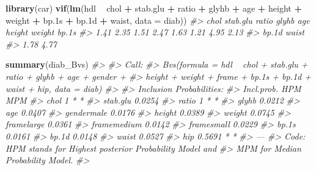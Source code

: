 \documentclass[]{book}
\newenvironment{Shaded}{\begin{snugshade}}{\end{snugshade}}
\newcommand{\CommentTok}[1]{\textcolor[rgb]{0.56,0.35,0.01}{\textit{#1}}}
\newcommand{\DataTypeTok}[1]{\textcolor[rgb]{0.13,0.29,0.53}{#1}}
\newcommand{\FloatTok}[1]{\textcolor[rgb]{0.00,0.00,0.81}{#1}}
\newcommand{\KeywordTok}[1]{\textcolor[rgb]{0.13,0.29,0.53}{\textbf{#1}}}
\newcommand{\NormalTok}[1]{#1}
\newcommand{\OperatorTok}[1]{\textcolor[rgb]{0.81,0.36,0.00}{\textbf{#1}}}
\newcommand{\StringTok}[1]{\textcolor[rgb]{0.31,0.60,0.02}{#1}}
\begin{document}
\begin{Shaded}
\begin{Highlighting}[]
\KeywordTok{library}\NormalTok{(car)}
\KeywordTok{vif}\NormalTok{(}\KeywordTok{lm}\NormalTok{(hdl }\OperatorTok{~}\StringTok{ }\NormalTok{chol }\OperatorTok{+}\StringTok{ }\NormalTok{stab.glu }\OperatorTok{+}\StringTok{ }\NormalTok{ratio }\OperatorTok{+}\StringTok{ }\NormalTok{glyhb }\OperatorTok{+}\StringTok{ }\NormalTok{age }\OperatorTok{+}\StringTok{ }\NormalTok{height }\OperatorTok{+}\StringTok{ }\NormalTok{weight }\OperatorTok{+}\StringTok{  }\NormalTok{bp}\FloatTok{.1}\NormalTok{s }\OperatorTok{+}\StringTok{ }\NormalTok{bp}\FloatTok{.1}\NormalTok{d }\OperatorTok{+}\StringTok{ }\NormalTok{waist, }\DataTypeTok{data =}\NormalTok{ diab))}
\CommentTok{#>     chol stab.glu    ratio    glyhb      age   height   weight    bp.1s }
\CommentTok{#>     1.41     2.35     1.51     2.47     1.63     1.21     4.95     2.13 }
\CommentTok{#>    bp.1d    waist }
\CommentTok{#>     1.78     4.77}
\end{Highlighting}
\end{Shaded}

\begin{Shaded}
\begin{Highlighting}[]
\KeywordTok{summary}\NormalTok{(diab_Bvs)}
\CommentTok{#> }
\CommentTok{#> Call:}
\CommentTok{#> Bvs(formula = hdl ~ chol + stab.glu + ratio + glyhb + age + gender + }
\CommentTok{#>     height + weight + frame + bp.1s + bp.1d + waist + hip, data = diab)}
\CommentTok{#> }
\CommentTok{#> Inclusion Probabilities:}
\CommentTok{#>             Incl.prob. HPM MPM}
\CommentTok{#> chol                 1   *   *}
\CommentTok{#> stab.glu        0.0254        }
\CommentTok{#> ratio                1   *   *}
\CommentTok{#> glyhb           0.0212        }
\CommentTok{#> age             0.0407        }
\CommentTok{#> gendermale      0.0176        }
\CommentTok{#> height          0.0389        }
\CommentTok{#> weight          0.0745        }
\CommentTok{#> framelarge      0.0361        }
\CommentTok{#> framemedium     0.0142        }
\CommentTok{#> framesmall      0.0229        }
\CommentTok{#> bp.1s           0.0161        }
\CommentTok{#> bp.1d           0.0148        }
\CommentTok{#> waist           0.0527        }
\CommentTok{#> hip             0.5691   *   *}
\CommentTok{#> ---}
\CommentTok{#> Code: HPM stands for Highest posterior Probability Model and}
\CommentTok{#>  MPM for Median Probability Model.}
\CommentTok{#> }
\end{Highlighting}
\end{Shaded}
\end{document}
